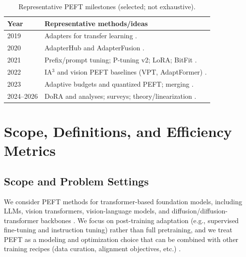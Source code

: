 \documentclass[conference]{IEEEtran}
\begin{document}
\begin{table}[t]
    \centering
    \caption{Representative PEFT milestones (selected; not exhaustive).}
    \label{tab:peft-timeline}
    \scriptsize
    \setlength{\tabcolsep}{3pt}
    \begin{tabular}{p{0.85cm}p{6.35cm}}
        \toprule
        \textbf{Year} & \textbf{Representative methods/ideas} \\
        \midrule
        2019 & Adapters for transfer learning \cite{houlsby2019parameter}. \\
        2020 & AdapterHub and AdapterFusion \cite{pfeiffer2020adapterhub,pfeiffer2020adapterfusion}. \\
        2021 & Prefix/prompt tuning; P-tuning v2; LoRA; BitFit \cite{li2021prefix,lester2021the,liu2021p,hu2021lora,benzaken2021bitfit}. \\
        2022 & IA$^3$ and vision PEFT baselines (VPT, AdaptFormer) \cite{liu2022few,jia2022visual,chen2022adaptformer}. \\
        2023 & Adaptive budgets and quantized PEFT; merging \cite{zhang2023adalora,dettmers2023qlora,yadav2023ties,he2023mera}. \\
        2024--2026 & DoRA and analyses; surveys; theory/linearization \cite{liu2024dora,si2024see,si2024task,han2024parameter,afzal2026linearization}. \\
        \bottomrule
    \end{tabular}
\end{table}

\section{Scope, Definitions, and Efficiency Metrics}
\subsection{Scope and Problem Settings}
We consider PEFT methods for transformer-based foundation models, including LLMs, vision transformers, vision-language models, and diffusion/diffusion-transformer backbones \cite{han2024parameter,prottasha2025peft,xin2024parameter}. We focus on post-training adaptation (e.g., supervised fine-tuning and instruction tuning) rather than full pretraining, and we treat PEFT as a modeling and optimization choice that can be combined with other training recipes (data curation, alignment objectives, etc.) \cite{wang2024parameter,zhang2025parameter}.
\end{document}
